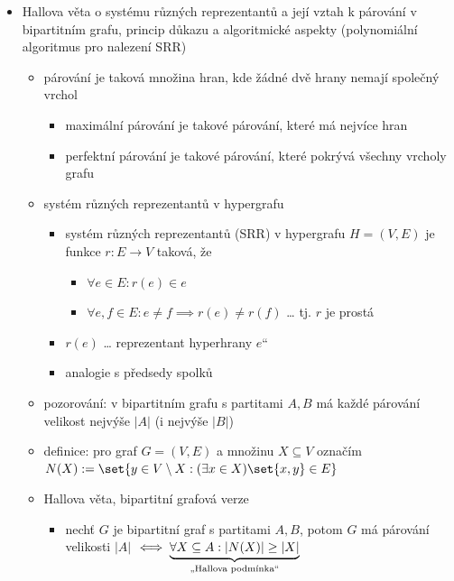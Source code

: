 \begin{itemize}
\begin{itemize}
\begin{itemize}
\begin{itemize}
\begin{itemize}
\end{itemize}
\item počet surjekcí $m^n-|\bigcup_{i=1}^m F_i|=m^n-\sum_{k=1}^m(-1)^{k+1}\binom mk(m-k)^n$ pak ještě upravíme do finálního tvaru $\quad\square$
\end{itemize}
\end{itemize}
\end{itemize}
\item Hallova věta o systému různých reprezentantů a její vztah k párování v bipartitním grafu, princip důkazu a algoritmické aspekty (polynomiální algoritmus pro nalezení SRR)
\begin{itemize}
\item párování je taková množina hran, kde žádné dvě hrany nemají společný vrchol
\begin{itemize}
\item maximální párování je takové párování, které má nejvíce hran
\item perfektní párování je takové párování, které pokrývá všechny vrcholy grafu
\end{itemize}
\item systém různých reprezentantů v hypergrafu
\begin{itemize}
\item systém různých reprezentantů (SRR) v hypergrafu $H=(V,E)$ je funkce $r:E\to V$ taková, že
\begin{itemize}
\item $\forall e\in E: r(e)\in e$
\item $\forall e,f\in E:e\neq f\implies r(e)\neq r(f)$ \dots{} tj. $r$ je prostá
\end{itemize}
\item $r(e)$ \dots{} \quotedblbase{}reprezentant hyperhrany $e$\textquotedblleft{}
\item analogie s předsedy spolků
\end{itemize}
\item pozorování: v bipartitním grafu s partitami $A,B$ má každé párování velikost nejvýše $|A|$ (i nejvýše $|B|$)
\item definice: pro graf $G=(V,E)$ a množinu $X\subseteq V$ označím $N(X):=\set{y\in V\setminus X: (\exists x\in X)\set{x,y}\in E}$
\item Hallova věta, bipartitní grafová verze
\begin{itemize}
\item nechť $G$ je bipartitní graf s partitami $A,B$, potom $G$ má párování velikosti $|A|$ $\iff\underbrace{\forall X\subseteq A:|N(X)|\geq |X|}_{\text{\quotedblbase{}Hallova podm\text{í}nka\textquotedblleft{}}}$

\end{itemize}
\end{itemize}
\end{itemize}
